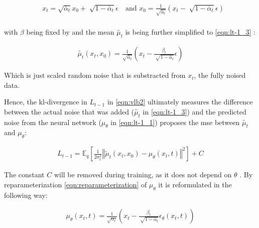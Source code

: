 \begin{equation}
  \begin{align}
    &x_t = \sqrt{\bar{\alpha}_{t}}x_0+\sqrt[]{1-\bar{\alpha}_t}\epsilon \quad\textrm{and }
    x_0 = \frac{1}{\sqrt{\bar{\alpha}_t}}(x_t-\sqrt[]{1-\bar{\alpha}_t}\epsilon) \nonumber\\
  \end{align}
\end{equation}

with $\beta$ being fixed by \cite{ho2020DenoisingDiffusionProbabilistic} and the mean $\tilde{\mu_t}$ is being further simplified to \autoref{eqn:lt-1_3} \cite{ho2020DenoisingDiffusionProbabilistic}:

\begin{equation}
  \begin{align}
    \label{eqn:lt-1_3}
    \tilde{\mu_t}(x_t, x_0) = \frac{1}{\sqrt{\bar{\alpha}_t}}(x_t - \frac{\beta_t}{\sqrt[]{1-\bar{\alpha}_t}}\epsilon)
  \end{align}
\end{equation}

Which is just scaled random noise that is substracted from $x_t$, the fully noised data.

Hence, the \gls{kl}-divergence in $L_{t-1}$ in \autoref{eqn:vlb2} ultimately measures the difference between the actual noise that was added ($\tilde{\mu_t}$ in \autoref{eqn:lt-1_3}) and the predicted noise from the neural network ($\mu_\theta$ in \autoref{eqn:lt-1_1})
\cite{ho2020DenoisingDiffusionProbabilistic} proposes the \gls{mse} between $\tilde{\mu_t}$ and $\mu_\theta$:

\begin{equation}
  \begin{align}
    \label{eqn:mse_loss}
    L_{t-1} = \mathbb{E}_q \left[ \frac{1}{2\sigma_t^2} \left\Vert \tilde{\mu}_t(x_t, x_0) - \mu_\theta(x_t, t) \right\Vert^2 \right] + C
  \end{align}
\end{equation}

The constant $C$ will be removed during training, as it does not depend on $\theta$ \cite{ho2020DenoisingDiffusionProbabilistic}.
By reparameterization \autoref{eqn:reparameterization} of $\mu_\theta$ it is reformulated in the following way:

\begin{equation}
  \begin{align}
    \label{eqn:mse_loss_2}
    \mu_\theta(x_t,t)= \frac{1}{\sqrt{\alpha_t}}(x_t - \frac{\beta_t}{\sqrt[]{1-\bar{\alpha}_t}}\epsilon_\theta(x_t,t)) 
  \end{align}
\end{equation}


